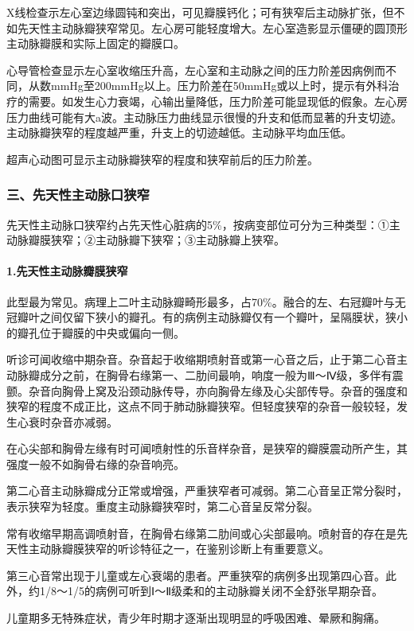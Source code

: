 X线检查示左心室边缘圆钝和突出，可见瓣膜钙化；可有狭窄后主动脉扩张，但不如先天性主动脉瓣狭窄常见。左心房可能轻度增大。左心室造影显示僵硬的圆顶形主动脉瓣膜和实际上固定的瓣膜口。

心导管检查显示左心室收缩压升高，左心室和主动脉之间的压力阶差因病例而不同，从数mmHg至200mmHg以上。压力阶差在50mmHg或以上时，提示有外科治疗的需要。如发生心力衰竭，心输出量降低，压力阶差可能显现低的假象。左心房压力曲线可能有大a波。主动脉压力曲线显示很慢的升支和低而显著的升支切迹。主动脉瓣狭窄的程度越严重，升支上的切迹越低。主动脉平均血压低。

超声心动图可显示主动脉瓣狭窄的程度和狭窄前后的压力阶差。

\subsubsection{三、先天性主动脉口狭窄}

先天性主动脉口狭窄约占先天性心脏病的5\%，按病变部位可分为三种类型：①主动脉瓣膜狭窄；②主动脉瓣下狭窄；③主动脉瓣上狭窄。

\paragraph{1.先天性主动脉瓣膜狭窄}

此型最为常见。病理上二叶主动脉瓣畸形最多，占70\%。融合的左、右冠瓣叶与无冠瓣叶之间仅留下狭小的瓣孔。有的病例主动脉瓣仅有一个瓣叶，呈隔膜状，狭小的瓣孔位于瓣膜的中央或偏向一侧。

听诊可闻收缩中期杂音。杂音起于收缩期喷射音或第一心音之后，止于第二心音主动脉瓣成分之前，在胸骨右缘第一、二肋间最响，响度一般为Ⅲ～Ⅳ级，多伴有震颤。杂音向胸骨上窝及沿颈动脉传导，亦向胸骨左缘及心尖部传导。杂音的强度和狭窄的程度不成正比，这点不同于肺动脉瓣狭窄。但轻度狭窄的杂音一般较轻，发生心衰时杂音亦减弱。

在心尖部和胸骨左缘有时可闻喷射性的乐音样杂音，是狭窄的瓣膜震动所产生，其强度一般不如胸骨右缘的杂音响亮。

第二心音主动脉瓣成分正常或增强，严重狭窄者可减弱。第二心音呈正常分裂时，表示狭窄为轻度。重度主动脉瓣狭窄时，第二心音呈反常分裂。

常有收缩早期高调喷射音，在胸骨右缘第二肋间或心尖部最响。喷射音的存在是先天性主动脉瓣膜狭窄的听诊特征之一，在鉴别诊断上有重要意义。

第三心音常出现于儿童或左心衰竭的患者。严重狭窄的病例多出现第四心音。此外，约1/8～1/5的病例可听到Ⅰ～Ⅱ级柔和的主动脉瓣关闭不全舒张早期杂音。

儿童期多无特殊症状，青少年时期才逐渐出现明显的呼吸困难、晕厥和胸痛。

